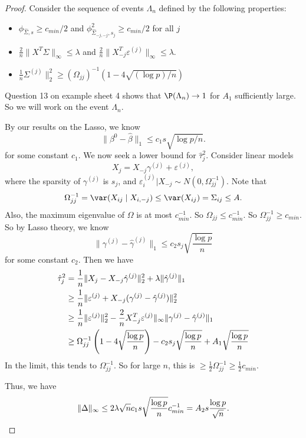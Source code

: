 \documentclass[a4paper]{article}
\begin{document}
\begin{proof}
  Consider the sequence of events $\Lambda_n$ defined by the following properties:
  \begin{itemize}
    \item $\phi_{\hat{\Sigma}, s} \geq c_{min}/2$ and $\phi^2_{\hat{\Sigma}_{-j, -j}, s_j} \geq c_{min}/2$ for all $j$
    \item $\frac{2}{n} \|X^T \Sigma\|_\infty \leq \lambda$ and $\frac{2}{n} \|X_{-j}^T  \varepsilon^{(j)} \|_\infty \leq \lambda$.
    \item $\frac{1}{n} \Sigma^{(j)} \|_2^2 \geq (\Omega_{jj})^{-1} (1 - 4 \sqrt{(\log p) / n})$
  \end{itemize}

  Question 13 on example sheet 4 shows that $\P(\Lambda_n) \to 1$ for $A_1$ sufficiently large. So we will work on the event $\Lambda_n$.

  By our results on the Lasso, we know
  \[
    \|\beta^0 - \hat{\beta}\|_1 \leq c_1 s \sqrt{\log p / n}.
  \]
  for some constant $c_1$. We now seek a lower bound for $\hat{\tau}_j^2$. Consider linear models
  \[
    X_j = X_{-j} \gamma^{(j)} + \varepsilon^{(j)},
  \]
  where the sparsity of $\gamma^{(j)}$ is $s_j$, and $\varepsilon_i^{(j)}| X_{-j} \sim N(0, \Omega_{jj}^{-1})$. Note that
  \[
    \Omega_{jj}^{-1} = \var (X_{ij} \mid X_{i, -j}) \leq \var(X_{ij}) = \Sigma_{ij} \leq A.
  \]
  Also, the maximum eigenvalue of $\Omega$ is at most $c_{min}^{-1}$. So $\Omega_{jj} \leq c_{min}^{-1}$. So $\Omega_{jj}^{-1} \geq c_{min}$. So by Lasso theory, we know
  \[
    \|\gamma^{(j)} - \hat{\gamma}^{(j)}\|_1 \leq c_2 s_j \sqrt{\frac{\log p}{n}}
  \]
  for some constant $c_2$. Then we have
  \begin{align*}
    \hat{\tau}_j^2 &= \frac{1}{n} \|X_j - X_{-j} \hat{\gamma}^{(j)} \|_2^2 + \lambda \|\hat{\gamma}^{(j)} \|_1\\
    &\geq \frac{1}{n} \|\varepsilon^{(j)} + X_{-j} (\gamma^{(j)} - \hat{\gamma}^{(j)})\|_2^2\\
    &\geq \frac{1}{n} \|\varepsilon^{(j)}\|_2^2 - \frac{2}{n} X_{-j}^T \varepsilon^{(j)}\|_\infty \|\gamma^{(j)} - \hat{\gamma}^{(j)}\|_1\\
    &\geq \Omega_{jj}^{-1} \left(1 - 4\sqrt{{\log p} \over n}\right) - c_2 s_j \sqrt{\frac{\log p}{n}} + A_1 \sqrt{\frac{\log p}{n}}
  \end{align*}
  In the limit, this tends to $\Omega_{jj}^{-1}$. So for large $n$, this is $\geq \frac{1}{2} \Omega_{jj}^{-1} \geq \frac{1}{2} c_{min}$.

  Thus, we have
  \[
    \|\Delta\|_\infty \leq 2\lambda \sqrt{n} c_1 s \sqrt{\frac{\log p}{n}} c_{min}^{-1} = A_2 s \frac{\log p}{\sqrt{n}}.\qedhere
  \]
\end{proof}


\printindex
\end{document}
